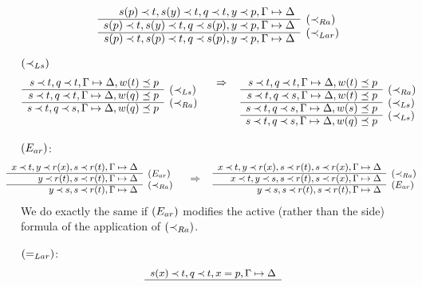 \begin{PROOF}
\begin{LS}
\[{ \begin{array}{rl}
s(p)\Incl t, s(y)\Incl t, q\Incl t, y\Incl p, \GSD \\ \cline{1-1}
s(p)\Incl t, s(y)\Incl t, q\Incl s(p), y\Incl p, \GSD &
\rabove{\iRa} \\ \cline{1-1}
s(p)\Incl t, s(p)\Incl t, q\Incl s(p), y\Incl p, \GSD &
\rabove{\iLar} \end{array} 
}
\]
%
\item $(\mathbin{\prec}_{Ls})$ %
\[ \prar{
s\Incl t, q\Incl t, \GSD, w(t)\preceq p \\ \cline{1-1}
s\Incl t, q\Incl t, \GSD, w(q)\preceq p & \rabove{\iLs} \\
\cline{1-1}
s\Incl t, q\Incl s, \GSD, w(q)\preceq p & \rabove{\iRa} 
}\conv
\prar{
s\Incl t, q\Incl t, \GSD, w(t)\preceq p \\ \cline{1-1}
s\Incl t, q\Incl s, \GSD, w(t)\preceq p & \rabove{\iRa} \\
\cline{1-1}
s\Incl t, q\Incl s, \GSD, w(s)\preceq p & \rabove{\iLs} \\
\cline{1-1} 
s\Incl t, q\Incl s, \GSD, w(q)\preceq p & \rabove{\iLs} 
} \]
\item $(E_{ar})$:
\[ \sma{
\begin{array}{rl}
x\Incl t, y\Incl r(x), s\Incl r(t), \GSD \\ \cline{1-1}
          y\Incl r(t), s\Incl r(t), \GSD  & \rabove{\Ear} \\ \cline{1-1}
          y\Incl s, s\Incl r(t), \GSD  & \rabove{\iRa} \end{array}
  \conv
 \begin{array}{rl}
x\Incl t, y\Incl r(x), s\Incl r(t), s\Incl r(x),\GSD \\ \cline{1-1}
x\Incl t, y\Incl s, s\Incl r(t), s\Incl r(x),\GSD  & \rabove{\iRa} \\ \cline{1-1}
          y\Incl s, s\Incl r(t), s\Incl r(t),\GSD  & \rabove{\Ear} \end{array} 
}\]
%
We do exactly the same if $(E_{ar})$ modifies the active (rather than the side)
formula of the application of $(\mathbin{\prec}_{Ra})$.
\item $(=_{Lar})$:
\[ \sma{
\begin{array}{rl}
s(x)\Incl t, q\Incl t, x=p, \GSD \\ \cline{1-1}

\end{array}}\]
\end{LS}
\end{PROOF}

